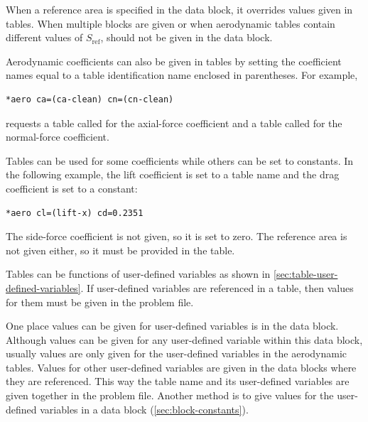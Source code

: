When a reference area is specified in the  data block, it
overrides values given in tables. When multiple  blocks are
given or when aerodynamic tables contain different values of $S_{\mathrm{ref}}$,
 should not be given in the  data block.


Aerodynamic coefficients can also be given in tables by setting the coefficient names
equal to a table identification name enclosed in parentheses. For example,

\begin{lstlisting}[style=taosmanual]
*aero ca=(ca-clean) cn=(cn-clean)
\end{lstlisting}

requests a table called  for the axial-force coefficient and a table
called  for the normal-force coefficient.

Tables can be used for some coefficients while others can be set to constants. In the
following example, the lift coefficient is set to a table name and the drag coefficient
is set to a constant:

\begin{lstlisting}[style=taosmanual]
*aero cl=(lift-x) cd=0.2351
\end{lstlisting}

The side-force coefficient is not given, so it is set to zero. The reference area is not
given either, so it must be provided in the  table.


Tables can be functions of user-defined variables as shown in
\cref{sec:table-user-defined-variables}. If user-defined variables are
referenced in a table, then values for them must be given in the problem file.

One place values can be given for user-defined variables is in the
 data block. Although values can be given for any user-defined
variable within this data block, usually values are only given for the user-defined
variables in the aerodynamic tables. Values for other user-defined variables are
given in the data blocks where they are referenced. This way the table name and its
user-defined variables are given together in the problem file. Another method is to
give values for the user-defined variables in a  data block
(\cref{sec:block-constants}).

